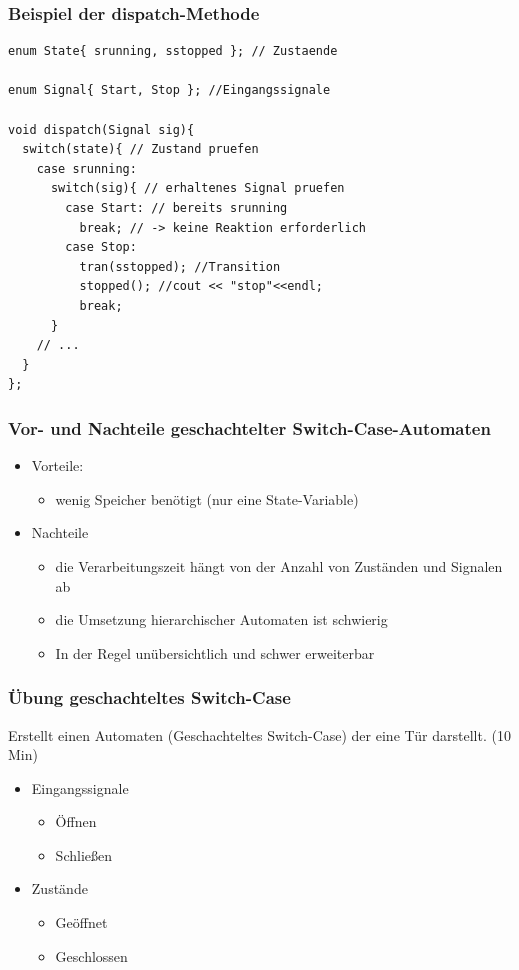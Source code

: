 \documentclass{beamer}
\begin{document}
\begin{frame}[fragile]
  \frametitle{Beispiel der dispatch-Methode}
  \begin{lstlisting}
enum State{ srunning, sstopped }; // Zustaende

enum Signal{ Start, Stop }; //Eingangssignale

void dispatch(Signal sig){
  switch(state){ // Zustand pruefen
    case srunning:
      switch(sig){ // erhaltenes Signal pruefen
        case Start: // bereits srunning  
          break; // -> keine Reaktion erforderlich
        case Stop:
          tran(sstopped); //Transition
          stopped(); //cout << "stop"<<endl;
          break;
      }
    // ...
  }  
};
  \end{lstlisting}
\end{frame}

\begin{frame}
  \frametitle{Vor- und Nachteile geschachtelter Switch-Case-Automaten}
  \begin{itemize}
    \item Vorteile:
    \begin{itemize}
      \item wenig Speicher ben\"otigt (nur eine State-Variable)
    \end{itemize}
    \item Nachteile
    \begin{itemize}
      \item die Verarbeitungszeit h\"angt von der Anzahl von Zust\"anden und Signalen ab
      \item die Umsetzung hierarchischer Automaten ist schwierig
      \item In der Regel unübersichtlich und schwer erweiterbar
    \end{itemize}
  \end{itemize}
\end{frame}

\begin{frame}
  \frametitle{\"Ubung geschachteltes Switch-Case}
  Erstellt einen Automaten (Geschachteltes Switch-Case) der eine T\"ur darstellt. (10 Min)
  \begin{itemize}
   \item Eingangssignale
   \begin{itemize}
    \item \"Offnen
    \item Schlie{\ss}en
   \end{itemize}
   \item Zust\"ande
   \begin{itemize}
    \item Ge\"offnet
    \item Geschlossen
   \end{itemize}
  \end{itemize}
\end{frame}
\end{document}
